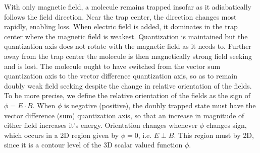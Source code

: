 \documentclass[%
 reprint,
groupedaddress,
 amsmath,amssymb,
 aps,
prl,
]{revtex4-1}
\newcommand{\epb}{{$E\!\perp\!B$}}
\begin{document}
With only magnetic field, a molecule remains trapped insofar as it adiabatically follows the field direction. Near the trap center, the direction changes most rapidly, enabling loss. When electric field is added, it dominates in the trap center where the magnetic field is weakest. Quantization is maintained but the quantization axis does not rotate with the magnetic field as it needs to. Further away from the trap center the molecule is then magnetically strong field seeking and is lost. The molecule ought to have switched from the vector sum quantization axis to the vector difference quantization axis, so as to remain doubly weak field seeking despite the change in relative orientation of the fields. To be more precise, we define the relative orientation of the fields as the sign of $\phi=E\cdot B$. When $\phi$ is negative (positive), the doubly trapped state must have the vector difference (sum) quantization axis, so that an increase in magnitude of either field increases it's energy. Orientation changes whenever $\phi$ changes sign, which occurs in a 2D region given by $\phi=0$, i.e. \epb. This region must by 2D, since it is a contour level of the 3D scalar valued function $\phi$. %
\end{document}
